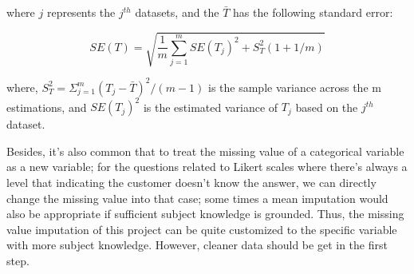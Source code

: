 \documentclass[12pt]{article}
\begin{document}
where $j$  represents the $j^{th}$ datasets, and the $\bar{T}$ has the following standard error:


\begin{equation}
S E(T)= \sqrt{ \frac{1}{m} \sum_{j=1}^{m} S E\left(T_{j}\right)^{2}+S_{T}^{2}(1+1 / m) }
\end{equation}


where, $S_{T}^{2}=\Sigma_{j=1}^{m}\left(T_{j}-\bar{T}\right)^{2} /(m-1)$ is the sample variance across the m estimations, and $S E\left(T_{j}\right)^{2}$ is the estimated variance of $T_j$ based on the $j^{th}$ dataset.


Besides, it's also common that to treat the missing value of a categorical variable as a new variable; for the questions related to Likert scales where there's always a level that indicating the customer doesn't know the answer, we can directly change the missing value into that case; some times a mean imputation would also be appropriate if sufficient subject knowledge is grounded. Thus, the missing value imputation of this project can be quite customized to the specific variable with more subject knowledge. However, cleaner data should be get in the first step.
\end{document}
